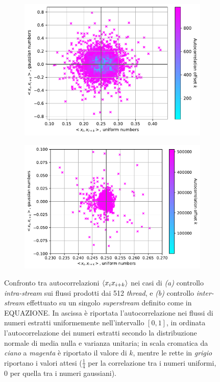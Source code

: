 \begin{figure}[t]
\centering
\begin{subfigure}{.5\textwidth}
  \centering
  \includegraphics[scale=0.5]{graphs/CorrelationTests_IntraStreamCorrelations.pdf}
  \caption{}
  \label{fig:intra_corr}
\end{subfigure}%
\begin{subfigure}{.5\textwidth}
  \centering
  \includegraphics[scale=0.5]{graphs/CorrelationTests_InterStreamCorrelations.pdf}
  \caption{}
  \label{fig:inter_corr}
\end{subfigure}
\caption{Confronto tra autocorrelazioni $\braket{x_i x_{i+k}}$ nei casi di \textit{(a)} controllo \textit{intra-stream} sui flussi prodotti dai 512 \textit{thread}, e \textit{(b)} controllo \textit{inter-stream} effettuato su un singolo \textit{superstream} definito come in EQUAZIONE. In ascissa è riportata l'autocorrelazione nei flussi di numeri estratti uniformemente nell'intervallo $[0,1]$, in ordinata l'autocorrelazione dei numeri estratti secondo la distribuzione normale di media nulla e varianza unitaria; in scala cromatica da \textit{ciano} a \textit{magenta} è riportato il valore di $k$, mentre le rette in \textit{grigio} riportano i valori attesi ($\frac{1}{4}$ per la correlazione tra i numeri uniformi, $0$ per quella tra i numeri gaussiani).}
\end{figure}

